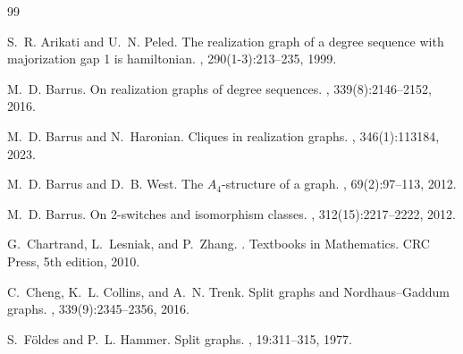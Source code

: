\documentclass[11pt]{article}
\begin{document}
\begin{thebibliography}{99}
	
	S.~R. Arikati and U.~N. Peled.
	\newblock The realization graph of a degree sequence with majorization gap 1 is
	hamiltonian.
	, 290(1-3):213--235, 1999.
	
	M.~D. Barrus.
	\newblock On realization graphs of degree sequences.
	, 339(8):2146--2152, 2016.
	
	M.~D. Barrus and N.~Haronian.
	\newblock Cliques in realization graphs.
	, 346(1):113184, 2023.
	
	M.~D. Barrus and D.~B. West.
	\newblock The {$A_4$}-structure of a graph.
	, 69(2):97--113, 2012.
	
	M.~D. Barrus.
	\newblock On 2-switches and isomorphism classes.
	, 312(15):2217--2222, 2012.
	
	
	
	G.~Chartrand, L.~Lesniak, and P.~Zhang.
	.
	\newblock Textbooks in Mathematics. CRC Press, 5th edition, 2010.
	
	C.~Cheng, K.~L. Collins, and A.~N. Trenk.
	\newblock Split graphs and {N}ordhaus--{G}addum graphs.
	, 339(9):2345--2356, 2016.
	
	
	S.~F{\"o}ldes and P.~L. Hammer.
	\newblock Split graphs.
	, 19:311--315, 1977.
	
	

\end{thebibliography}
\end{document}
